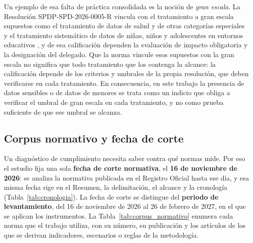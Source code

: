 Un ejemplo de esa falta de práctica consolidada es la noción de \textit{gran escala}. La Resolución SPDP-SPD-2026-0005-R vincula con el tratamiento a gran escala supuestos como el tratamiento de datos de salud y de otras categorías especiales y el tratamiento sistemático de datos de niñas, niños y adolescentes en entornos educativos \cite[arts.~12 y 14]{spdp2026granescala}, y de esa calificación dependen la evaluación de impacto obligatoria y la designación del delegado. Que la norma vincule esos supuestos con la gran escala no significa que todo tratamiento que los contenga la alcance: la calificación depende de los criterios y umbrales de la propia resolución, que deben verificarse en cada tratamiento. En consecuencia, en este trabajo la presencia de datos sensibles o de datos de menores se trata como un indicio que obliga a verificar el umbral de gran escala en cada tratamiento, y no como prueba suficiente de que ese umbral se alcanza.

\subsection{Corpus normativo y fecha de corte}
\label{sec:corpus_normativo}

Un diagnóstico de cumplimiento necesita saber contra qué normas mide. Por eso el estudio fija una sola \textbf{fecha de corte normativa}, el \textbf{16 de noviembre de 2026}: se analiza la normativa publicada en el Registro Oficial hasta ese día, y esa misma fecha rige en el Resumen, la delimitación, el alcance y la cronología (Tabla~\ref{tab:cronologia}). La fecha de corte se distingue del \textbf{periodo de levantamiento}, del 16 de noviembre de 2026 al 26 de febrero de 2027, en el que se aplican los instrumentos. La Tabla~\ref{tab:corpus_normativo} enumera cada norma que el trabajo utiliza, con su número, su publicación y los artículos de los que se derivan indicadores, escenarios o reglas de la metodología.

